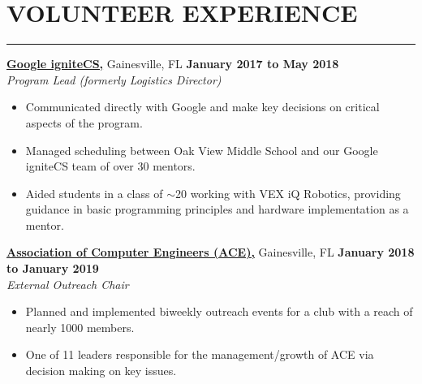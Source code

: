 \section*{VOLUNTEER EXPERIENCE}

\hrule \relax
\sectionheaderspace

\noindent \href{https://sites.google.com/view/ignitecs/home}{\textbf{Google igniteCS,}} Gainesville, FL \hfill\textbf{January 2017 to May 2018}\\
\textit{Program Lead (formerly Logistics Director)}
\begin{itemize}[noitemsep,nolistsep, label = {-}]
	\item Communicated directly with Google and make key decisions on critical aspects of the program.
	\item Managed scheduling between Oak View Middle School and our Google igniteCS team of over 30 mentors.
	\item Aided students in a class of $\sim$20 working with VEX iQ Robotics, providing guidance in basic programming principles and hardware implementation as a mentor.
\end{itemize} 
\subsectionspace

\noindent \href{https://uf-ace.com/}{\textbf{Association of Computer Engineers (ACE),}} Gainesville, FL \hfill\textbf{January 2018 to January 2019}\\
\textit{External Outreach Chair}
\begin{itemize}[noitemsep,nolistsep, label={-}]
	\item Planned and implemented biweekly outreach events for a club with a reach of nearly 1000 members.
	\item One of 11 leaders responsible for the management/growth of ACE via decision making on key issues.
\end{itemize}
\subsectionspace
